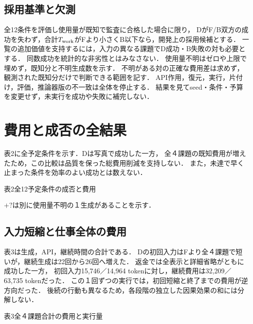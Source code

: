 \documentclass[uplatex,a4paper,twocolumn,10pt]{jsarticle}
\begin{document}
\subsection{採用基準と欠測}
全12条件を評価し使用量が既知で監査に合格した場合に限り，
DがF/B双方の成功を失わず，合計$T_{\rm work}$がFより小さくB以下なら，開発上の採用候補とする．
一覧の追加価値を支持するには，入力の異なる課題でD成功・B失敗の対も必要とする．
同数成功を統計的な非劣性とはみなさない．
使用量不明はゼロや上限で埋めず，既知分と不明生成数を示す．
不明がある対の正確な費用差は求めず，観測された既知分だけで判断できる範囲を記す．
API作用，復元，実行，片付け，評価，推論器版の不一致は全体を停止する．
結果を見てseed・条件・予算を変更せず，未実行を成功や失敗に補完しない．

\section{費用と成否の全結果}
\InventoryResultSummary
表2に全予定条件を示す．Dは写真で成功した一方，
全４課題の既知費用が増えたため，この比較は品質を保った総費用削減を支持しない．
また，未達で早く止まった条件を効率のよい成功とは数えない．

\begin{center}\begin{minipage}{\columnwidth}\centering
\small 表2\quad 全12予定条件の成否と費用\par\smallskip
\InventoryAllCells
\par\smallskip\footnotesize $+?$は別に使用量不明の１生成があることを示す．
\end{minipage}\end{center}

\subsection{入力短縮と仕事全体の費用}
\InventoryContrasts
表3は生成，API，継続時間の合計である．
Dの初回入力はFより全４課題で短いが，継続生成は22回から26回へ増えた．
返金では全表示と詳細省略がともに成功した一方，
初回入力15,746／14,964 tokenに対し，継続費用は32,209／63,735 tokenだった．
この１回ずつの実行では，初回短縮と終了までの費用が逆方向だった．
後続の行動も異なるため，各段階の独立した因果効果の和には分解しない．

\begin{center}\begin{minipage}{\columnwidth}\centering
\small 表3\quad 全４課題合計の費用と実行量\par\smallskip
\InventoryTotals
\end{minipage}\end{center}
\end{document}
